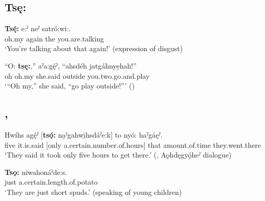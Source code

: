\subsection*{\textbf{Tsę:} } \label{p:[tsę:]}

\ea
\label{ex:tpart115}
\gll \textbf{Tsę́:} e:ˀ neˀ satró:wi:.\\
oh.my again the you.are.talking\\
\glt ‘You’re talking about that again!’ (expression of disgust)
\z

\ea
\label{ex:tpart116}
\gll “O: \textbf{tsę:},” aˀa:gę́ˀ, “ahsdéh jatgáhnye̱hah!”\\
oh oh.my she.said outside you.two.go.and.play\\
\glt ‘“Oh my,” she said, “go play outside!”’ (\cite{henry_de_2005})
\z


\subsection*{ , } \label{p:[tsǫ:]}

\ea
\label{ex:tpart117}
\gll Hwíhs agę́ˀ [\textbf{tsǫ́:} na̱ˀgahwi̱hsdáˀe:k] to nyó: haˀgáęˀ.\\
five it.is.said [only a.certain.number.of.hours] that amount.of.time they.went.there\\
\glt ‘They said it took only five hours to get there.’ (\cite[508]{mithun_watewayestanih_1984}, Aǫhdęgyǫ́heˀ dialogue)
\z

\ea
\label{ex:tpart118}
\gll \textbf{Tsǫ:} niwahonáˀde:s.\\
just a.certain.length.of.potato\\
\glt ‘They are just short spuds.’ (speaking of young children)
\z

